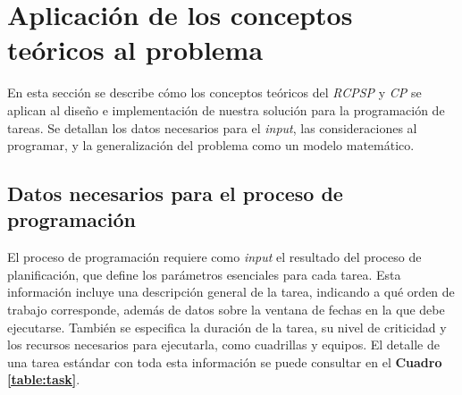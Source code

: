 \documentclass{article}
\begin{document}



\section{Aplicación de los conceptos teóricos al problema}

En esta sección se describe cómo los conceptos teóricos del \textit{RCPSP} y \textit{CP} se aplican al diseño e implementación de nuestra solución para la programación de tareas. Se detallan los datos necesarios para el \textit{input}, las consideraciones al programar, y la generalización del problema como un modelo matemático.

\subsection{Datos necesarios para el proceso de programación}  

El proceso de programación requiere como \textit{input} el resultado del proceso de planificación, que define los parámetros esenciales para cada tarea. Esta información incluye una descripción general de la tarea, indicando a qué orden de trabajo corresponde, además de datos sobre la ventana de fechas en la que debe ejecutarse. También se especifica la duración de la tarea, su nivel de criticidad y los recursos necesarios para ejecutarla, como cuadrillas y equipos. El detalle de una tarea estándar con toda esta información se puede consultar en el \textbf{Cuadro \ref{table:task}}.  
\end{document}
